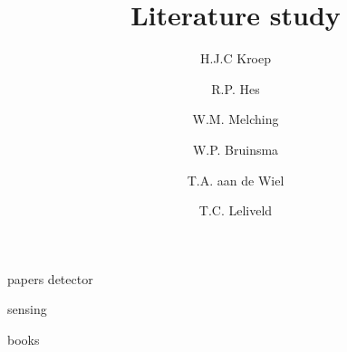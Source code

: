 \documentclass[report, a4paper, openany, oneside]{memoir}
\title{Literature study}
\author{H.J.C Kroep \and R.P. Hes \and W.M. Melching \and W.P. Bruinsma \and T.A. aan de Wiel \and T.C. Leliveld}
\begin{document}
\maketitle
\clearpage

\frontmatter
\tableofcontents

\mainmatter
{papers}
{detector}

{sensing}

{books}

\printbibliography

\appendix
\end{document}
